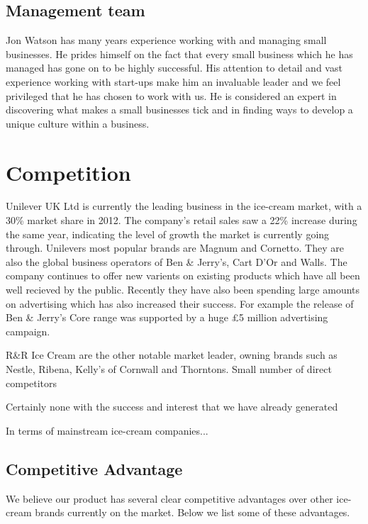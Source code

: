\documentclass{article}
\begin{document}
  \subsection{Management team}

Jon Watson has many years experience working with and managing small
businesses. He prides himself on the fact that every small business which he has managed has gone on to be highly successful. His attention to detail and vast experience working with start-ups make him an invaluable leader and we feel privileged that he has chosen to work with us. He is considered an expert in discovering what makes a small businesses tick and in finding ways to develop a unique culture within a business.


\section{Competition}

  Unilever UK Ltd is currently the leading business in the ice-cream market, with a 30\% market share in 2012. The company's retail sales saw a 22\% increase during the same year, indicating the level of growth the market is currently going through. Unilevers most popular brands are Magnum and Cornetto. They are also the global business operators of Ben \& Jerry's, Cart D'Or and Walls. The company continues to offer new varients on existing products which have all been well recieved by the public. Recently they have also been spending large amounts on advertising which has also increased their success. For example the release of Ben \& Jerry's Core range was supported by a huge £5 million advertising campaign.

  R\&R Ice Cream are the other notable market leader, owning brands such as Nestle, Ribena, Kelly's of Cornwall and Thorntons.  
  Small number of direct competitors

  Certainly none with the success and interest that we have already generated

  In terms of mainstream ice-cream companies...


  \subsection{Competitive Advantage}

We believe our product has several clear competitive advantages over
other ice-cream brands currently on the market. Below we list some of these advantages.
\end{document}
